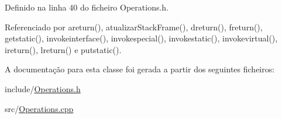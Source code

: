 Definido na linha 40 do ficheiro Operations.\+h.



Referenciado por areturn(), atualizar\+Stack\+Frame(), dreturn(), freturn(), getstatic(), invokeinterface(), invokespecial(), invokestatic(), invokevirtual(), ireturn(), lreturn() e putstatic().



A documentação para esta classe foi gerada a partir dos seguintes ficheiros\+:\begin{DoxyCompactItemize}
\item 
include/\hyperlink{Operations_8h}{Operations.\+h}\item 
src/\hyperlink{Operations_8cpp}{Operations.\+cpp}\end{DoxyCompactItemize}

